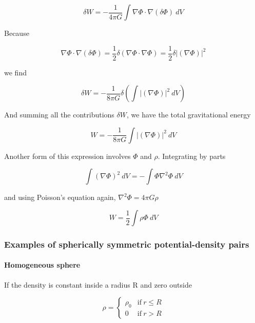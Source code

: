 \begin{equation}
\delta W =  - \frac{1}{4\pi G}\int \nabla \varPhi \cdot \nabla \left( \delta \varPhi\right) \ dV
\end{equation}

Because 

\begin{equation}
\nabla \varPhi \cdot \nabla \left( \delta \varPhi\right) = \frac{1}{2}\delta \left(\nabla \varPhi \cdot \nabla \varPhi \right) = \frac{1}{2}\delta \vert \left(\nabla \varPhi \right) \vert^2
\end{equation}

we find 

\begin{equation}
\delta W =  - \frac{1}{8\pi G}\delta \left(\int \vert \left(\nabla \varPhi \right) \vert^2 \ dV \right)
\end{equation}

And summing all the contributions $\delta W$, we have the total gravitational energy 

\begin{equation}
 W =  - \frac{1}{8\pi G} \int \vert \left(\nabla \varPhi \right) \vert^2 \ dV 
\end{equation}


Another form of this expression involves $\varPhi$ and $\rho$. Integrating by parts 

\begin{equation}
\int  \left(\nabla \varPhi \right)^2  \ dV = -\int \varPhi \nabla^2 \varPhi \ dV
\end{equation}

and using Poisson's equation again, $\nabla^2\varPhi = 4\pi G \rho$

\begin{equation}
 W =  \frac{1}{2} \int \rho \varPhi \ dV 
\end{equation}


\subsubsection{Examples of spherically symmetric potential-density pairs}

\paragraph{Homogeneous sphere}

If the density is constant inside a radius R and zero outside 

\begin{equation}
\rho = \left\{ \begin{array}{cc} 
\rho_0 & \mathrm{if} \ r \leq R \\
0 & \mathrm{if} \ r > R
\end{array} \right.
\end{equation}

